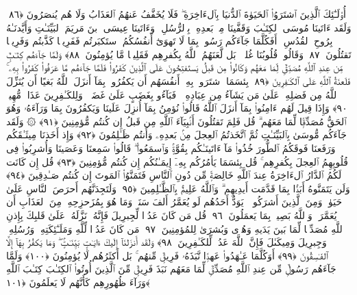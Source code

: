  أُو۟لَـٰٓئِكَ ٱلَّذِينَ ٱشتَرَوُا۟ ٱلحَيَوٰةَ ٱلدُّنيَا بِٱلءَاخِرَةِ ۖ فَلَا يُخَفَّفُ عَنهُمُ ٱلعَذَابُ وَلَا هُم يُنصَرُونَ ﴿٨٦﴾
 وَلَقَد ءَاتَينَا مُوسَى ٱلكِتَـٰبَ وَقَفَّينَا مِنۢ بَعدِهِۦ بِٱلرُّسُلِ ۖ وَءَاتَينَا عِيسَى ٱبنَ مَريَمَ ٱلبَيِّنَـٰتِ وَأَيَّدنَـٰهُ بِرُوحِ ٱلقُدُسِ ۗ أَفَكُلَّمَا جَآءَكُم رَسُولٌۢ بِمَا لَا تَهوَىٰٓ أَنفُسُكُمُ ٱستَكبَرتُم فَفَرِيقًۭا كَذَّبتُم وَفَرِيقًۭا تَقتُلُونَ ﴿٨٧﴾
 وَقَالُوا۟ قُلُوبُنَا غُلفٌۢ ۚ بَل لَّعَنَهُمُ ٱللَّهُ بِكُفرِهِم فَقَلِيلًۭا مَّا يُؤمِنُونَ ﴿٨٨﴾
 وَلَمَّا جَآءَهُم كِتَـٰبٌۭ مِّن عِندِ ٱللَّهِ مُصَدِّقٌۭ لِّمَا مَعَهُم وَكَانُوا۟ مِن قَبلُ يَستَفتِحُونَ عَلَى ٱلَّذِينَ كَفَرُوا۟ فَلَمَّا جَآءَهُم مَّا عَرَفُوا۟ كَفَرُوا۟ بِهِۦ ۚ فَلَعنَةُ ٱللَّهِ عَلَى ٱلكَـٰفِرِينَ ﴿٨٩﴾
 بِئسَمَا ٱشتَرَوا۟ بِهِۦٓ أَنفُسَهُم أَن يَكفُرُوا۟ بِمَآ أَنزَلَ ٱللَّهُ بَغيًا أَن يُنَزِّلَ ٱللَّهُ مِن فَضلِهِۦ عَلَىٰ مَن يَشَآءُ مِن عِبَادِهِۦ ۖ فَبَآءُو بِغَضَبٍ عَلَىٰ غَضَبٍۢ ۚ وَلِلكَـٰفِرِينَ عَذَابٌۭ مُّهِينٌۭ ﴿٩٠﴾
 وَإِذَا قِيلَ لَهُم ءَامِنُوا۟ بِمَآ أَنزَلَ ٱللَّهُ قَالُوا۟ نُؤمِنُ بِمَآ أُنزِلَ عَلَينَا وَيَكفُرُونَ بِمَا وَرَآءَهُۥ وَهُوَ ٱلحَقُّ مُصَدِّقًۭا لِّمَا مَعَهُم ۗ قُل فَلِمَ تَقتُلُونَ أَنۢبِيَآءَ ٱللَّهِ مِن قَبلُ إِن كُنتُم مُّؤمِنِينَ ﴿٩١﴾
 ۞ وَلَقَد جَآءَكُم مُّوسَىٰ بِٱلبَيِّنَـٰتِ ثُمَّ ٱتَّخَذتُمُ ٱلعِجلَ مِنۢ بَعدِهِۦ وَأَنتُم ظَـٰلِمُونَ ﴿٩٢﴾
 وَإِذ أَخَذنَا مِيثَـٰقَكُم وَرَفَعنَا فَوقَكُمُ ٱلطُّورَ خُذُوا۟ مَآ ءَاتَينَـٰكُم بِقُوَّةٍۢ وَٱسمَعُوا۟ ۖ قَالُوا۟ سَمِعنَا وَعَصَينَا وَأُشرِبُوا۟ فِى قُلُوبِهِمُ ٱلعِجلَ بِكُفرِهِم ۚ قُل بِئسَمَا يَأمُرُكُم بِهِۦٓ إِيمَـٰنُكُم إِن كُنتُم مُّؤمِنِينَ ﴿٩٣﴾
 قُل إِن كَانَت لَكُمُ ٱلدَّارُ ٱلءَاخِرَةُ عِندَ ٱللَّهِ خَالِصَةًۭ مِّن دُونِ ٱلنَّاسِ فَتَمَنَّوُا۟ ٱلمَوتَ إِن كُنتُم صَـٰدِقِينَ ﴿٩٤﴾
 وَلَن يَتَمَنَّوهُ أَبَدًۢا بِمَا قَدَّمَت أَيدِيهِم ۗ وَٱللَّهُ عَلِيمٌۢ بِٱلظَّـٰلِمِينَ ﴿٩٥﴾
 وَلَتَجِدَنَّهُم أَحرَصَ ٱلنَّاسِ عَلَىٰ حَيَوٰةٍۢ وَمِنَ ٱلَّذِينَ أَشرَكُوا۟ ۚ يَوَدُّ أَحَدُهُم لَو يُعَمَّرُ أَلفَ سَنَةٍۢ وَمَا هُوَ بِمُزَحزِحِهِۦ مِنَ ٱلعَذَابِ أَن يُعَمَّرَ ۗ وَٱللَّهُ بَصِيرٌۢ بِمَا يَعمَلُونَ ﴿٩٦﴾
 قُل مَن كَانَ عَدُوًّۭا لِّجِبرِيلَ فَإِنَّهُۥ نَزَّلَهُۥ عَلَىٰ قَلبِكَ بِإِذنِ ٱللَّهِ مُصَدِّقًۭا لِّمَا بَينَ يَدَيهِ وَهُدًۭى وَبُشرَىٰ لِلمُؤمِنِينَ ﴿٩٧﴾
 مَن كَانَ عَدُوًّۭا لِّلَّهِ وَمَلَـٰٓئِكَتِهِۦ وَرُسُلِهِۦ وَجِبرِيلَ وَمِيكَىٰلَ فَإِنَّ ٱللَّهَ عَدُوٌّۭ لِّلكَـٰفِرِينَ ﴿٩٨﴾
 وَلَقَد أَنزَلنَآ إِلَيكَ ءَايَـٰتٍۭ بَيِّنَـٰتٍۢ ۖ وَمَا يَكفُرُ بِهَآ إِلَّا ٱلفَـٰسِقُونَ ﴿٩٩﴾
 أَوَكُلَّمَا عَـٰهَدُوا۟ عَهدًۭا نَّبَذَهُۥ فَرِيقٌۭ مِّنهُم ۚ بَل أَكثَرُهُم لَا يُؤمِنُونَ ﴿١٠٠﴾
 وَلَمَّا جَآءَهُم رَسُولٌۭ مِّن عِندِ ٱللَّهِ مُصَدِّقٌۭ لِّمَا مَعَهُم نَبَذَ فَرِيقٌۭ مِّنَ ٱلَّذِينَ أُوتُوا۟ ٱلكِتَـٰبَ كِتَـٰبَ ٱللَّهِ وَرَآءَ ظُهُورِهِم كَأَنَّهُم لَا يَعلَمُونَ ﴿١٠١﴾
